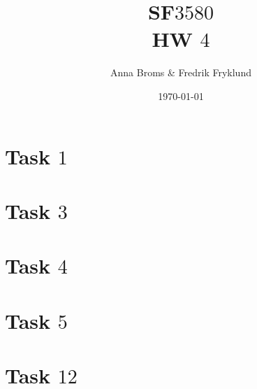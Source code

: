 \documentclass[a4paper]{article}
\title{SF$3580$\\HW $4$}
\author{Anna Broms \& Fredrik Fryklund}
\date{\today}
\begin{document}
\maketitle

 \section*{Task $1$}
 
  \section*{Task $3$}
  
 \section*{Task $4$}
 
 \section*{Task $5$}
 
\section*{Task $12$}

\end{document}
